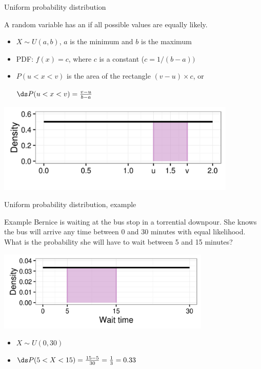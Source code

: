 \documentclass[xcolor=table, handout]{beamer}
\begin{document}
\begin{frame}{Uniform probability distribution}
\begin{block}{}
{\large A random variable has an  if all possible values are equally likely.}
\begin{itemize}
\pause\item $X \sim U(a,b)$, $a$ is the minimum and $b$ is the maximum
\pause\item PDF: $f(x) = c$, where $c$ is a constant ($c = 1/(b-a))$
\pause\item $P(u < x < v)$ is the area of the rectangle $(v-u) \times c$, or\\
\smallskip
{\centering $\ds P(u < x < v) = \frac {v-u}{b-a}$ \par} 
\end{itemize}
\end{block}
\smallskip
{\centering
\includegraphics[width=4.5in]{../images/ch6_uniform}
\par}

\end{frame}

\begin{frame}{Uniform probability distribution, example}
\begin{exampleblock}{Example}
Bernice is waiting at the bus stop in a torrential downpour. She knows the bus will arrive any time between 0 and 30 minutes with equal likelihood. What is the probability she will have to wait between 5 and 15 minutes?\\
\smallskip
{\centering
\includegraphics[width=4in]{../images/ch6_bus}
\par}
\begin{itemize}
\pause\item $X \sim U(0,30)$
\pause\item $\ds P(5 < X < 15) = \frac{15-5}{30} = \frac 1 3 = 0.33$
\end{itemize}
\end{exampleblock}
\end{frame}
\end{document}
